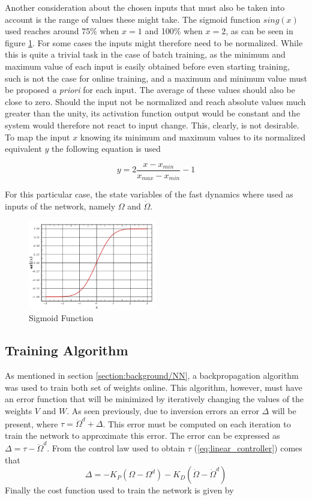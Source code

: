 Another consideration about the chosen inputs that must also be taken into account is the range of values these might take. The sigmoid function $sing(x)$ used reaches around 75\% when $x=1$ and 100\% when $x=2$, as can be seen in figure \ref{fig:sigmoid}. For some cases the inputs might therefore need to be normalized. While this is quite a trivial task in the case of batch training, as the minimum and maximum value of each input is easily obtained before even starting training, such is not the case for online training, and a maximum and minimum value must be proposed \emph{a priori} for each input. The average of these values should also be close to zero. Should the input not be normalized and reach absolute values much greater than the unity, its activation function output would be constant and the system would therefore not react to input change. This, clearly, is not desirable. To map the input $x$ knowing its minimum and maximum values to its normalized equivalent $y$ the following equation is used

\begin{equation}
y=2\dfrac{x-x_{min}}{x_{max}-x_{min}}-1
\label{eq:normalisation}
\end{equation}

For this  particular case, the state variables of the fast dynamics where used as inputs of the network, namely $\Omega$ and $\dot{\Omega}$.

\begin{figure}[!htb]
  \centering
  \includegraphics[width=0.5\textwidth]{Figures/sigmoid.png}
  \caption[Sigmoid Function]{Sigmoid Function}
  \label{fig:sigmoid}
\end{figure}

\subsection{Training Algorithm}

As mentioned in section \ref{section:background/NN}, a backpropagation algorithm was used to train both set of weights online. This algorithm, however, must have an error function that will be minimized by iteratively changing the values of the weights $V$ and $W$. As seen previously, due to inversion errors an error $\Delta$ will be present, where $\tau = \ddot{\Omega}^d + \Delta$. This error must be computed on each iteration to train the network to approximate this error. The error can be expressed as $\Delta=\tau - \ddot{\Omega}^d$. From the control law used to obtain $\tau$ (\ref{eq:linear_controller}) comes that
\begin{equation}
\Delta = -K_P(\Omega-\Omega^d)-K_D(\dot{\Omega}-\dot{\Omega}^d)
\end{equation}
Finally the cost function used to train the network is given by

